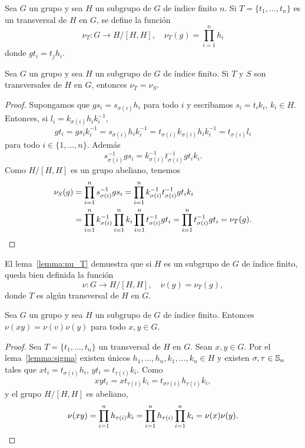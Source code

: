 \begin{definition}
	\label{definition:nu_T}
	Sea $G$ un grupo y sea $H$ un subgrupo de $G$ de índice finito $n$. Si
	$T=\{t_1,\dots,t_n\}$ es un transversal de $H$ en $G$, se define la función 
	\[
		\nu_T\colon G\to H/[H,H],\quad
		\nu_T(g)=\prod_{i=1}^n h_i
	\]
	donde $gt_i=t_jh_i$.
\end{definition}

\begin{lemma}
	\label{lemma:nu_T}
	Sea $G$ un grupo y sea $H$ un subgrupo de $G$ de índice finito. Si $T$ y
	$S$ son transversales de $H$ en $G$, entonces $\nu_T=\nu_S$.
\end{lemma}

\begin{proof}
	Supongamos que $gs_i=s_{\sigma(i)}h_i$ para todo $i$ y escribamos
	$s_i=t_ik_i$, $k_i\in H$. Entonces, si $l_i=k_{\sigma(i)}h_ik_i^{-1}$, 
	\[
	gt_i=gs_ik_i^{-1}=s_{\sigma(i)}h_ik_i^{-1}=t_{\sigma(i)}k_{\sigma(i)}h_ik_i^{-1}=t_{\sigma(i)}l_i
	\]
	para todo $i\in\{1,\dots,n\}$. Además 
	\[
			s_{\sigma(i)}^{-1}gs_i=k_{\sigma(i)}^{-1}t_{\sigma(i)}^{-1}gt_ik_i.
	\]
	Como $H/[H,H]$ es un grupo abeliano, tenemos 
	\begin{align*}
		\nu_S(g)
		&=\prod_{i=1}^n s_{\sigma(i)}^{-1}gs_i
		=\prod_{i=1}^n k_{\sigma(i)}^{-1}t_{\sigma(i)}^{-1}gt_ik_i\\
		&=\prod_{i=1}^n k_{\sigma(i)}^{-1}\prod_{i=1}^n k_i\prod_{i=1}^n t_{\sigma(i)}^{-1}gt_i
		=\prod_{i=1}^n t_{\sigma(i)}^{-1}gt_i
		=\nu_T(g).\qedhere
	\end{align*}
\end{proof}

El lema~\ref{lemma:nu_T} demuestra que si $H$ es un subgrupo de $G$ de índice
finito, queda bien definida la función
\[
\nu\colon G\to H/[H,H],
\quad
\nu(g)=\nu_T(g),
\]
donde $T$ es algún transversal de $H$ en $G$. 

\begin{theorem}
	\label{theorem:transfer}
	Sea $G$ un grupo y sea $H$ un subgrupo de $G$ de índice finito. Entonces
	$\nu(xy)=\nu(v)\nu(y)$ para todo $x,y\in G$.
\end{theorem}

\begin{proof}
	Sea $T=\{t_1,\dots,t_n\}$ un transversal de $H$ en $G$. Sean $x,y\in G$. Por el
	lema~\ref{lemma:sigma} existen únicos $h_1,\dots,h_n,k_1,\dots,k_n\in H$ y
	existen $\sigma,\tau\in\mathbb{S}_n$ tales que $xt_i=t_{\sigma(i)}h_i$,
	$yt_i=t_{\tau(i)}k_i$. Como
	\[
	xyt_i=xt_{\tau(i)}k_i=t_{\sigma\tau(i)}h_{\tau(i)}k_i,
	\]
	y el grupo $H/[H,H]$ es abeliano, 
	\[
		\nu(xy)=\prod_{i=1}^n h_{\tau(i)}k_i=\prod_{i=1}^n h_{\tau(i)}\prod_{i=1}^n k_i=\nu(x)\nu(y).\qedhere
	\]
\end{proof}

